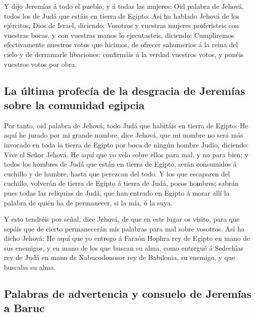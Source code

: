  Y dijo Jeremías á todo el pueblo, y á todas las mujeres:
Oid palabra de Jehová, todos los de Judá que estáis en tierra de Egipto:
 Así ha hablado Jehová de los ejércitos, Dios de Israel,
diciendo: Vosotros y vuestras mujeres proferisteis con vuestras bocas, y
con vuestras manos lo ejecutasteis, diciendo: Cumpliremos efectivamente
nuestros votos que hicimos, de ofrecer sahumerios á la reina del cielo y
de derramarle libaciones: confirmáis á la verdad vuestros votos, y
ponéis vuestros votos por obra.

\hypertarget{la-uxfaltima-profecuxeda-de-la-desgracia-de-jeremuxedas-sobre-la-comunidad-egipcia}{%
\subsection{La última profecía de la desgracia de Jeremías sobre la
comunidad
egipcia}\label{la-uxfaltima-profecuxeda-de-la-desgracia-de-jeremuxedas-sobre-la-comunidad-egipcia}}

 Por tanto, oid palabra de Jehová, todo Judá que habitáis
en tierra de Egipto: He aquí he jurado por mi grande nombre, dice
Jehová, que mi nombre no será más invocado en toda la tierra de Egipto
por boca de ningún hombre Judío, diciendo: Vive el Señor Jehová.
 He aquí que yo velo sobre ellos para mal, y no para bien;
y todos los hombres de Judá que están en tierra de Egipto, serán
consumidos á cuchillo y de hambre, hasta que perezcan del todo.
 Y los que escaparen del cuchillo, volverán de tierra de
Egipto á tierra de Judá, pocos hombres; sabrán pues todas las reliquias
de Judá, que han entrado en Egipto á morar allí la palabra de quién ha
de permanecer, si la mía, ó la suya.

 Y esto tendréis por señal, dice Jehová, de que en este
lugar os visito, para que sepáis que de cierto permanecerán mis palabras
para mal sobre vosotros.  Así ha dicho Jehová: He aquí que
yo entrego á Faraón Hophra rey de Egipto en mano de sus enemigos, y en
mano de los que buscan su alma, como entregué á Sedechîas rey de Judá en
mano de Nabucodonosor rey de Babilonia, su enemigo, y que buscaba su
alma.

\hypertarget{palabras-de-advertencia-y-consuelo-de-jeremuxedas-a-baruc}{%
\subsection{Palabras de advertencia y consuelo de Jeremías a
Baruc}\label{palabras-de-advertencia-y-consuelo-de-jeremuxedas-a-baruc}}

